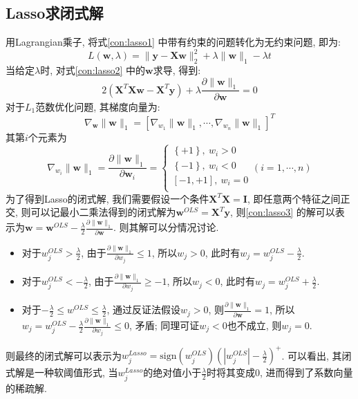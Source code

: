 \subsection{Lasso求闭式解}
用Lagrangian乘子, 将式\eqref{con:lasso1} 中带有约束的问题转化为无约束问题, 即为:
\begin{equation}
L\left( \boldsymbol{w},\lambda \right) =\lVert \mathbf{y}-\mathbf{X}\boldsymbol{w} \rVert _{2}^{2}+\lambda \lVert \boldsymbol{w} \rVert _1-\lambda t \label{con:lasso2}
\end{equation}
当给定$\lambda$时, 对式\eqref{con:lasso2} 中的$\boldsymbol{w}$求导, 得到:
\begin{equation}
2\left( \mathbf{X}^T\mathbf{X}\boldsymbol{w}-\mathbf{X}^T\mathbf{y} \right) +\lambda \frac{\partial \lVert \boldsymbol{w} \rVert _1}{\partial \boldsymbol{w}}=0  \label{con:lasso3}
\end{equation}
对于$L_1$范数优化问题,  其梯度向量为:
\begin{equation}
\nabla _{\boldsymbol{w}}\lVert \boldsymbol{w} \rVert _1=\left[ \nabla _{w_1}\lVert \boldsymbol{w} \rVert _1,\cdots ,\nabla _{w_n}\lVert \boldsymbol{w} \rVert _1 \right] ^T
\end{equation}
其第$i$个元素为
\begin{equation}
\nabla _{w_i}\lVert \boldsymbol{w} \rVert _1=\frac{\partial \lVert \boldsymbol{w} \rVert _1}{\partial \boldsymbol{w}_i}=\left\{ \begin{array}{l}
	\left\{ +1 \right\} ,\ w_i>0\\
	\left\{ -1 \right\} ,\ w_i<0\\
	\left[ -1,+1 \right] ,\ w_i=0\\
\end{array}\left( i=1,\cdots ,n \right) \right. 
\end{equation}
为了得到Lasso的闭式解, 我们需要假设一个条件$\mathbf{X}^T\mathbf{X}=\mathbf{I} $, 即任意两个特征之间正交, 则可以记最小二乘法得到的闭式解为$\boldsymbol{w}^{OLS}=\mathbf{X}^T\mathbf{y}$, 则\eqref{con:lasso3} 的解可以表示为$\boldsymbol{w}=\boldsymbol{w}^{OLS}-\frac{\lambda}{2}\frac{\partial \lVert \boldsymbol{w} \rVert _1}{\partial \boldsymbol{w}}$. 则其解可以分情况讨论.
\begin{itemize}
	\item 对于$w^{OLS}_j>\frac{\lambda}{2}$, 由于$\frac{\partial \lVert \boldsymbol{w} \rVert _1}{\partial w_j}\le 1$, 所以$w_j>0$, 此时有$w_j=w_{j}^{OLS}-\frac{\lambda}{2}$.
	\item 对于$w^{OLS}_j<-\frac{\lambda}{2}$, 由于$\frac{\partial \lVert \boldsymbol{w} \rVert _1}{\partial w_j}\ge -1$, 所以$w_j<0$, 此时有$w_j=w_{j}^{OLS}+\frac{\lambda}{2}$.
	\item 对于$-\frac{\lambda}{2}\le w^{OLS}\le\frac{\lambda}{2}$, 通过反证法假设$w_j>0$, 则$\frac{\partial \lVert \boldsymbol{w} \rVert _1}{\partial \boldsymbol{w}}=1$, 所以$w_j =w^{OLS}_j-\frac{\lambda}{2}\frac{\partial \lVert \boldsymbol{w} \rVert _1}{\partial w_j} \le 0$, 矛盾; 同理可证$w_j<0$也不成立, 则$w_j= 0$.
\end{itemize}
则最终的闭式解可以表示为$w_{j}^{Lasso}=\text{sign}\left( w_{j}^{OLS} \right) \left( \left| w_{j}^{OLS} \right|-\frac{\lambda}{2} \right) ^+ $. 可以看出, 其闭式解是一种软阈值形式, 当$w_{j}^{Lasso}$的绝对值小于$\frac{\lambda}{2}$时将其变成0, 进而得到了系数向量的稀疏解. 
